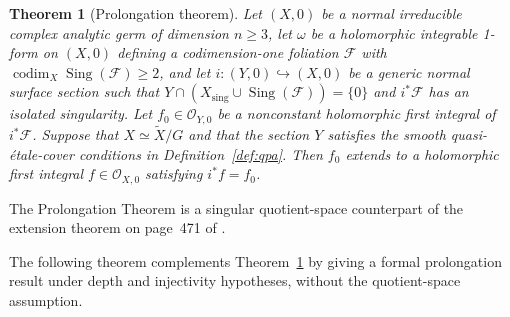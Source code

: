\documentclass[11pt,twoside]{amsart}
\newcommand{\OO}{\mathcal O}
\newcommand{\F}{\mathcal F}
\DeclareMathOperator{\Sing}{Sing}
\DeclareMathOperator{\codim}{codim}
\newtheorem{mainthm}{Theorem}
\theoremstyle{definition}
\begin{document}
\begin{mainthm}[Prolongation theorem]\label{thm:E}\normalfont
Let $(X,0)$ be a normal irreducible complex analytic germ of dimension
$n\geq3$, let $\omega$ be a holomorphic integrable 1-form on $(X,0)$ defining a codimension-one foliation $\F$ with
$\codim_X\Sing(\F)\geq2$, and let
$i:(Y,0)\hookrightarrow(X,0)$ be a generic normal surface section such that
$Y\cap(X_{\mathrm{sing}}\cup\Sing(\F))=\{0\}$ and $i^*\F$ has an isolated
singularity. Let
$f_0\in\OO_{Y,0}$ be a nonconstant holomorphic first integral of $i^*\F$.
Suppose that $X\simeq\widetilde X/G$ and that the section $Y$ satisfies
the smooth quasi-\'etale-cover conditions in
Definition~\ref{def:qpa}. Then $f_0$ extends to a holomorphic first integral
$f\in\OO_{X,0}$ satisfying $i^*f=f_0$.
\end{mainthm}

The Prolongation Theorem is a singular quotient-space counterpart of the
extension theorem on page~471 of \cite{MatteiMoussu1980}.

The following theorem complements Theorem~\ref{thm:E} by giving a
formal prolongation result under depth and injectivity hypotheses, without
the quotient-space assumption.
\end{document}
